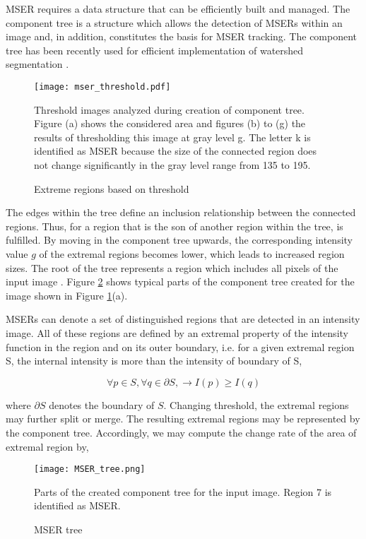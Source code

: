 MSER requires a data structure that can be efficiently built and managed. The component tree is a structure which allows the detection of MSERs within an image and, in addition, constitutes the basis for MSER tracking. The component tree has been recently used for efficient implementation of watershed segmentation \cite{couprie2005algorithms} .
\begin{figure}[H]
	\centering 
	\texttt{[image: mser\_threshold.pdf]}
	\caption{Extreme regions based on threshold}
	\label{mser:K}
	\medskip
	\small	
	Threshold images analyzed during creation of component tree. Figure (a) shows the considered area and figures (b) to (g) the results of thresholding this image at gray level g. The letter k is identified as MSER because the size of the connected region does not change significantly in the gray level range from 135 to 195.
	
\end{figure}
 
The edges within the tree define an inclusion relationship between the connected regions. Thus, for a region  that is the son of another region  within the tree,
is fulfilled. By moving in the component tree upwards, the corresponding intensity value $g$ of the extremal regions becomes lower, which leads to increased region sizes. The root of the tree represents a region which includes all pixels of the input image . Figure \ref{mser:tree} shows typical parts of the component tree created for the image shown in Figure \ref{mser:K}(a).


MSERs can denote a set of distinguished regions that are detected in an intensity image. All of these regions are defined by an extremal property of the intensity function in the region and on its outer boundary, i.e. for a given extremal region S, the internal intensity is more than the intensity of boundary of S,

\[ \forall p \in S,\forall q \in \partial S , \longrightarrow I(p) \geq I(q)\]

where $\partial S $ denotes the boundary of $S$.
Changing threshold, the extremal regions may further split or merge. The resulting extremal regions may be represented by the component tree. Accordingly, we may compute the change rate of the area of extremal region by,
\begin{figure}[H]
	\centering 
	\texttt{[image: MSER\_tree.png]}
	\caption{MSER tree}
	\label{mser:tree}
	\medskip
	\small
	Parts of the created component tree for the input image. Region 7 is identified as MSER.
\end{figure}


